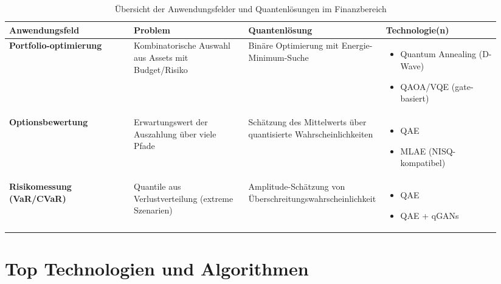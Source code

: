 \begin{table}[!htbp]
\centering
\renewcommand{\arraystretch}{1.5}
\begin{tabular}{|p{0.25\linewidth}|p{0.23\linewidth}|p{0.23\linewidth}|p{0.23\linewidth}|}
\hline
\textbf{Anwendungsfeld} & \textbf{Problem} & \textbf{Quantenlösung} & \textbf{Technologie(n)} \\
\hline
\textbf{Portfolio-optimierung} & 
Kombinatorische Auswahl aus Assets mit Budget/Risiko & 
Binäre Optimierung mit Energie-Minimum-Suche & 
\begin{minipage}[t]{\linewidth}
\begin{itemize}[leftmargin=*,noitemsep]
  \item Quantum Annealing (D-Wave)
  \item QAOA/VQE (gate-basiert)
\end{itemize}
\end{minipage} \\
\hline
\textbf{Optionsbewertung} & 
Erwartungswert der Auszahlung über viele Pfade & 
Schätzung des Mittelwerts über quantisierte Wahrscheinlichkeiten & 
\begin{minipage}[t]{\linewidth}
\begin{itemize}[leftmargin=*,noitemsep]
  \item QAE
  \item MLAE (NISQ-kompatibel)
\end{itemize}
\end{minipage} \\
\hline
\textbf{Risikomessung (VaR/CVaR)} & 
Quantile aus Verlustverteilung (extreme Szenarien) & 
Amplitude-Schätzung von Überschreitungswahrscheinlichkeit & 
\begin{minipage}[t]{\linewidth}
\begin{itemize}[leftmargin=*,noitemsep]
  \item QAE
  \item QAE + qGANs
\end{itemize}
\end{minipage} \\
\hline
\end{tabular}
\caption{Übersicht der Anwendungsfelder und Quantenlösungen im Finanzbereich}
\label{tab:qc_overview}
\end{table}






\section{Top Technologien und Algorithmen}

